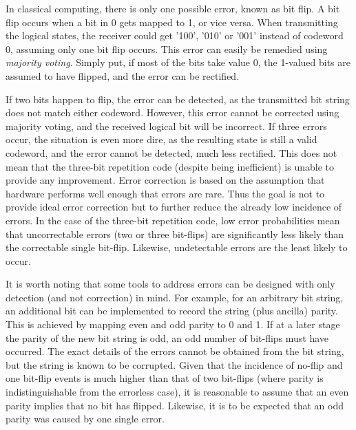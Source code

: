 In classical computing, there is only one possible error, known as bit flip. A bit flip occurs when a bit in 0 gets mapped to 1, or vice versa. When transmitting the logical states, the receiver could get '100', '010' or '001' instead of codeword 0, assuming only one bit flip occurs. This error can easily be remedied using \textit{majority voting}. Simply put, if most of the bits take value 0, the 1-valued bits are assumed to have flipped, and the error can be rectified. 

If two bits happen to flip, the error can be detected, as the transmitted bit string does not match either codeword. However, this error cannot be corrected using majority voting, and the received logical bit will be incorrect. If three errors occur, the situation is even more dire, as the resulting state is still a valid codeword, and the error cannot be detected, much less rectified. This does not mean that the three-bit repetition code (despite being inefficient) is unable to provide any improvement. Error correction is based on the assumption that hardware performs well enough that errors are rare. Thus the goal is not to provide ideal error correction but to further reduce the already low incidence of errors. In the case of the three-bit repetition code, low error probabilities mean that uncorrectable errors (two or three bit-flips) are significantly less likely than the correctable single bit-flip. Likewise, undetectable errors are the least likely to occur. 

It is worth noting that some tools to address errors can be designed with only detection (and not correction) in mind. For example, for an arbitrary bit string, an additional bit can be implemented to record the string (plus ancilla) parity. This is achieved by mapping even and odd parity to 0 and 1. If at a later stage the parity of the new bit string is odd, an odd number of bit-flips must have occurred. The exact details of the errors cannot be obtained from the bit string, but the string is known to be corrupted. Given that the incidence of no-flip and one bit-flip events is much higher than that of two bit-flips (where parity is indistinguishable from the errorless case), it is reasonable to assume that an even parity implies that no bit has flipped. Likewise, it is to be expected that an odd parity was caused by one single error.

